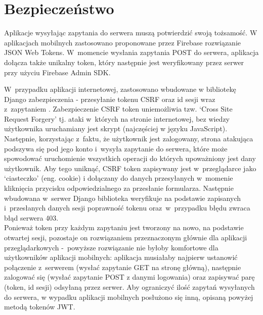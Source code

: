 \section{Bezpieczeństwo}

Aplikacje wysyłając zapytania do serwera muszą potwierdzić swoją tożsamość. 
W aplikacjach mobilnych zastosowano proponowane przez Firebase rozwiązanie JSON Web Tokens. W~momencie wysłania zapytania POST do serwera, aplikacja dołącza także unikalny token, który następnie jest weryfikowany przez serwer przy użyciu Firebase Admin SDK.

W~przypadku aplikacji internetowej, zastosowano wbudowane w bibliotekę Django zabezpieczenia - przesyłanie tokenu CSRF oraz id sesji wraz z~zapytaniem \cite{djangoCSRF}. Zabezpieczenie CSRF token uniemożliwia tzw. `Cross Site Request Forgery' tj. ataki w~których na stronie internetowej, bez wiedzy użytkownika uruchamiany jest skrypt (najczęściej w języku JavaScript). Następnie, korzystając z~faktu, że użytkownik jest zalogowany, strona atakująca podszywa się pod jego konto i~wysyła zapytanie do serwera, które może spowodować uruchomienie wszystkich operacji do których upoważniony jest dany użytkownik. Aby tego uniknąć, CSRF token zapisywany jest w~przeglądarce jako `ciasteczko' (eng. cookie) i dołączany do danych przesyłanych w~momenie kliknięcia przycisku odpowiedzialnego za przesłanie formularza. Następnie wbudowana w~serwer Django biblioteka weryfikuje na podstawie zapisanych i~przesłanych danych sesji poprawność tokenu oraz~w~przypadku błędu zwraca błąd serwera 403.
\\Ponieważ token przy każdym zapytaniu jest tworzony na nowo, na podstawie otwartej sesji, pozostaje on rozwiązaniem przeznaczonym głównie dla aplikacji przeglądarkowych -~powyższe rozwiązanie nie byłoby komfortowe dla użytkowników aplikacji mobilnych: aplikacja musiałaby najpierw ustanowić połączenie z~serwerem (wysłać zapytanie GET na stronę główną), następnie zalogować się (wysłać zapytanie POST z danymi logowania) oraz zapisywać parę (token, id sesji) odsyłaną przez serwer. Aby ograniczyć ilość zapytań wysyłanych do serwera, w wypadku aplikacji mobilnych posłużono się inną, opisaną powyżej metodą tokenów JWT.
